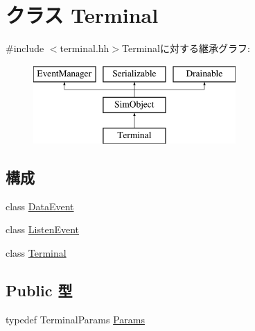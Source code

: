 \hypertarget{classTerminal}{
\section{クラス Terminal}
\label{classTerminal}
}


{\ttfamily \#include $<$terminal.hh$>$}Terminalに対する継承グラフ:\begin{figure}[H]
\begin{center}
\leavevmode
\includegraphics[height=3cm]{classTerminal}
\end{center}
\end{figure}
\subsection*{構成}
\begin{DoxyCompactItemize}
\item 
class \hyperlink{classTerminal_1_1DataEvent}{DataEvent}
\item 
class \hyperlink{classTerminal_1_1ListenEvent}{ListenEvent}
\item 
class \hyperlink{classTerminal_1_1Terminal}{Terminal}
\end{DoxyCompactItemize}
\subsection*{Public 型}
\begin{DoxyCompactItemize}
\item 
typedef TerminalParams \hyperlink{classTerminal_aa60a1659eb9e560503e47d6cbedd5ace}{Params}
\end{DoxyCompactItemize}
